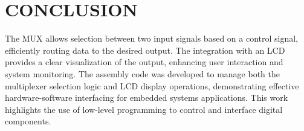 \documentclass[conference]{IEEEtran}
\begin{document}
\section{CONCLUSION}
The MUX allows selection between two input signals based on a control signal, efficiently routing data to the desired output. The integration with an LCD provides a clear visualization of the output, enhancing user interaction and system monitoring. The assembly code was developed to manage both the multiplexer selection logic and LCD display operations, demonstrating effective hardware-software interfacing for embedded systems applications. This work highlights the use of low-level programming to control and interface digital components.
\end{document}
